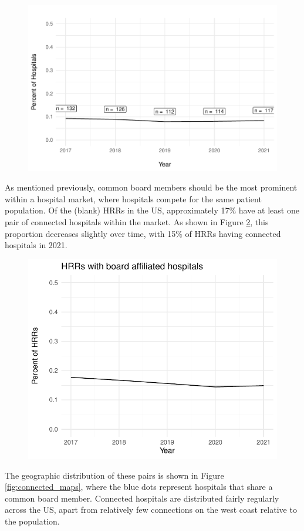 \documentclass[12pt]{article}
\begin{document}
    \begin{figure}[ht!]
        \centering
        \includegraphics[width=.7\textwidth]{Objects/connected_percent.pdf}
        \label{fig:connected_percent}
    \end{figure}

    As mentioned previously, common board members should be the most prominent within a hospital market, where hospitals compete for the same patient population. Of the (blank) HRRs in the US, approximately 17\% have at least one pair of connected hospitals within the market. As shown in Figure \ref{fig:connected_HRR_percent}, this proportion decreases slightly over time, with 15\% of HRRs having connected hospitals in 2021.  

    \begin{figure}[ht!]
        \centering
        \includegraphics[width=.7\textwidth]{Objects/connected_independent_HRR_percent.pdf}
        \label{fig:connected_HRR_percent}
    \end{figure}

    The geographic distribution of these pairs is shown in Figure \ref{fig:connected_maps}, where the blue dots represent hospitals that share a common board member. Connected hospitals are distributed fairly regularly across the US, apart from relatively few connections on the west coast relative to the population. 
\end{document}

